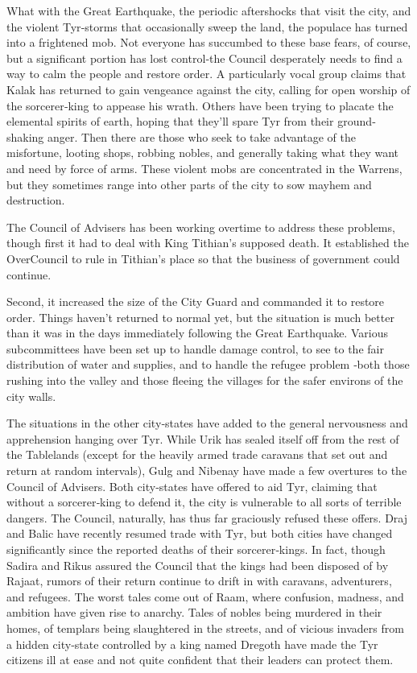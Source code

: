 {	What with the Great Earthquake, the periodic aftershocks that visit the city, and the violent Tyr‐storms that occasionally sweep the land, the populace has turned into a frightened mob. Not everyone has succumbed to these base fears, of course, but a significant portion has lost control‐the Council desperately needs to find a way to calm the people and restore order. A particularly vocal group claims that Kalak has returned to gain vengeance against the city, calling for open worship of the sorcerer‐king to appease his wrath. Others have been trying to placate the elemental spirits of earth, hoping that they'll spare Tyr from their ground‐shaking anger. Then there are those who seek to take advantage of the misfortune, looting shops, robbing nobles, and generally taking what they want and need by force of arms. These violent mobs are concentrated in the Warrens, but they sometimes range into other parts of the city to sow mayhem and destruction.

	The Council of Advisers has been working overtime to address these problems, though first it had to deal with King Tithian's supposed death. It established the OverCouncil to rule in Tithian's place so that the business of government could continue.

	Second, it increased the size of the City Guard and commanded it to restore order. Things haven't returned to normal yet, but the situation is much better than it was in the days immediately following the Great Earthquake. Various subcommittees have been set up to handle damage control, to see to the fair distribution of water and supplies, and to handle the refugee problem ‐both those rushing into the valley and those fleeing the villages for the safer environs of the city walls.

	The situations in the other city‐states have added to the general nervousness and apprehension hanging over Tyr. While Urik has sealed itself off from the rest of the Tablelands (except for the heavily armed trade caravans that set out and return at random intervals), Gulg and Nibenay have made a few overtures to the Council of Advisers. Both city‐states have offered to aid Tyr, claiming that without a sorcerer‐king to defend it, the city is vulnerable to all sorts of terrible dangers. The Council, naturally, has thus far graciously refused these offers. Draj and Balic have recently resumed trade with Tyr, but both cities have changed significantly since the reported deaths of their sorcerer‐kings. In fact, though Sadira and Rikus assured the Council that the kings had been disposed of by Rajaat, rumors of their return continue to drift in with caravans, adventurers, and refugees. The worst tales come out of Raam, where confusion, madness, and ambition have given rise to anarchy. Tales of nobles being murdered in their homes, of templars being slaughtered in the streets, and of vicious invaders from a hidden city‐state controlled by a king named Dregoth have made the Tyr citizens ill at ease and not quite confident that their leaders can protect them.

}
